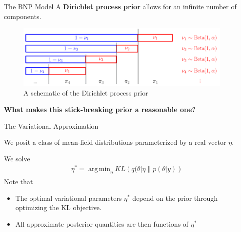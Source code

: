 \documentclass[10pt]{beamer}\usepackage[]{graphicx}\usepackage[]{color}
\DeclareMathOperator*{\argmin}{arg\,min}
\begin{document}
\begin{frame}{The BNP Model}
A {\bf Dirichlet process prior} allows for an infinite number of components. 
\vspace{-0.2in}
\begin{figure}[!h]
\centering
\includegraphics[width = 0.95\textwidth]{./figures/DP_stick_breaking.png}
\caption{A schematic of the Dirichlet process prior}
\end{figure}
\pause 
\begin{mdframed}[style=MyFrame]
\begin{center}
{\bf What makes this stick-breaking prior a reasonable one?}
\end{center}
\end{mdframed}

\end{frame}

\begin{frame}{The Variational Approximation}

We posit a class of mean-field distributions parameterized by a real vector $\eta$. 

We solve
\begin{align*}
  \eta^* = \argmin_{\eta} KL\left(
      q(\theta \vert \eta \big\| p(\theta | y)
      \right)
\end{align*}
%
Note that 

\begin{itemize}
\item The optimal variational parameters $\eta^*$ depend on the prior through optimizing the KL objective. 

\item All approximate posterior quantities are then functions of $\eta^*$

\end{itemize}

\end{frame}
\end{document}
